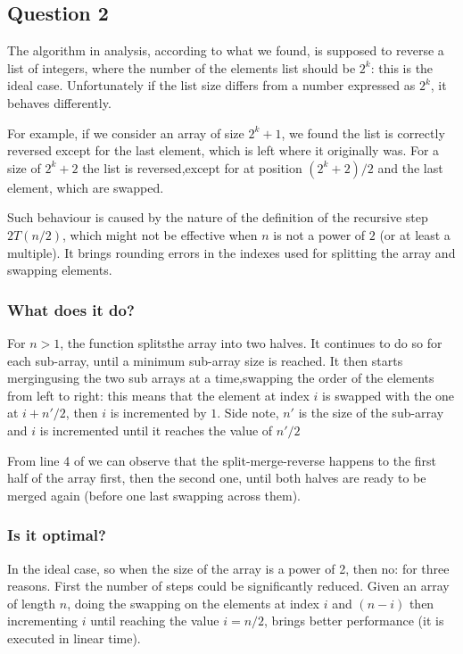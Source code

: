 \documentclass[12pt]{article}
\begin{document}
\subsection*{Question 2}

The algorithm in analysis, according to what we found, is supposed to reverse a list of integers, where the number of the elements
list should be $2^k$: this is the ideal case. Unfortunately if the list size differs from a number expressed as $2^k$, it behaves
differently. 

For example, if we consider an array of size $2^k + 1$, we found the list is correctly reversed except for the last element, which
is left where it originally was. For a size of $2^k + 2$ the list is reversed,except for at position $(2^k + 2)/2$ and the last element, which are swapped.

Such behaviour is caused by the nature of the definition of the recursive step $2T(n/2)$, which might not be effective 
when $n$ is not a power of $2$ (or at least a multiple). It brings rounding errors in the indexes used for splitting the array and swapping elements.

\subsubsection*{What does it do?}

For $n > 1$, the  function splits\footnotemark[1]   the array into two halves. It continues to do so for each sub-array, until a minimum sub-array size is reached. It then starts merging\footnotemark[1] using  the two sub arrays at a time,swapping the order of the elements from left to right: this means that the element at index $i$ is swapped with the one at $i + n'/2$, then $i$ is incremented by $1$. Side note, $n'$ is the size of the sub-array and $i$ is incremented until it reaches the value of $n'/2$

From line 4 of  we can observe that the split-merge-reverse happens to the first half of the array first, 
then the second one, until both halves are ready to be merged again (before one last swapping across them). 

\subsubsection*{Is it optimal?}

In the ideal case, so when the size of the array is a power of 2, then no: for three reasons. First the number of steps could 
be significantly reduced. Given an array of length $n$, doing the swapping on the elements at index $i$ and $(n-i)$ then incrementing $i$ until reaching the value $i = n/2$, brings better performance (it is executed in linear time). 
\end{document}
